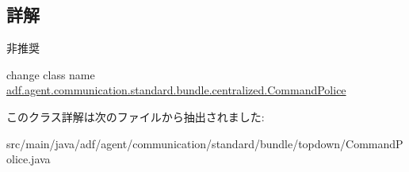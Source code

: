 \subsection{詳解}
\begin{DoxyRefDesc}{非推奨}
\item[\hyperlink{deprecated__deprecated000003}{非推奨}]change class name \hyperlink{classadf_1_1agent_1_1communication_1_1standard_1_1bundle_1_1centralized_1_1CommandPolice}{adf.\+agent.\+communication.\+standard.\+bundle.\+centralized.\+Command\+Police} \end{DoxyRefDesc}


このクラス詳解は次のファイルから抽出されました\+:\begin{DoxyCompactItemize}
\item 
src/main/java/adf/agent/communication/standard/bundle/topdown/Command\+Police.\+java\end{DoxyCompactItemize}
